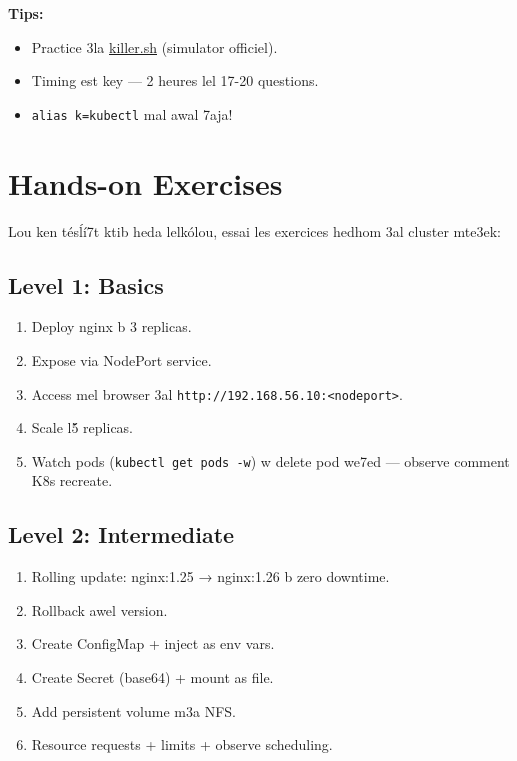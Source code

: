 \documentclass[11pt,a4paper]{book}
\newcommand{\cmd}[1]{\texttt{#1}}
\begin{document}
\textbf{Tips:}
\begin{itemize}
  \item Practice 3la \href{https://killer.sh}{killer.sh} (simulator officiel).
  \item Timing est key --- 2 heures lel 17-20 questions.
  \item \cmd{alias k=kubectl} mal awal 7aja!
\end{itemize}

\cleardoublepage

\chapter{Hands-on Exercises}

Lou ken t\'es\'l\'i7t ktib heda lelk\'olou, essai les exercices hedhom 3al cluster mte3ek:

\section{Level 1: Basics}

\begin{enumerate}
  \item Deploy nginx b 3 replicas.
  \item Expose via NodePort service.
  \item Access mel browser 3al \texttt{http://192.168.56.10:<nodeport>}.
  \item Scale l\'5 replicas.
  \item Watch pods (\cmd{kubectl get pods -w}) w delete pod we7ed --- observe comment K8s recreate.
\end{enumerate}

\section{Level 2: Intermediate}

\begin{enumerate}
  \item Rolling update: nginx:1.25 → nginx:1.26 b zero downtime.
  \item Rollback awel version.
  \item Create ConfigMap + inject as env vars.
  \item Create Secret (base64) + mount as file.
  \item Add persistent volume m3a NFS.
  \item Resource requests + limits + observe scheduling.
\end{enumerate}
\end{document}
